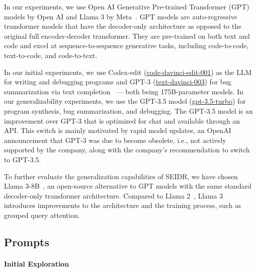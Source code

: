 In our experiments, we use Open AI Generative Pre-trained Transformer (GPT) models by Open AI and Llama 3 by Meta~\cite{roziereCodeLlamaOpen2024}. 
GPT models are auto-regressive transformer models that have the decoder-only architecture as opposed to the original full encoder-decoder transformer.
They are pre-trained on both text and code and excel at sequence-to-sequence generative tasks, including code-to-code, text-to-code, and code-to-text.

In our initial experiments, we use Codex-edit (\href{https://openai.com/index/gpt-3-edit-insert/}{code-davinci-edit-001})
as the LLM for writing and debugging programs and GPT-3 (\href{https://platform.openai.com/docs/deprecations}{text-davinci-003}) for bug summarization via text completion~\cite{brown2020:language} --- both being 175B-parameter models.
In our generalizability experiments, we use the GPT-3.5 model (\href{https://platform.openai.com/docs/models/gpt-3-5-turbo}{gpt-3.5-turbo}) for program synthesis, bug summarization, and debugging. 
The GPT-3.5 model is an improvement over GPT-3 that is optimized for chat and available through an API.
This switch is mainly motivated by rapid model updates, an OpenAI announcement that GPT-3 was due to become obsolete, i.e., not actively supported by the company, along with the company's recommendation to switch to GPT-3.5. 

To further evaluate the generalization capabilities of SEIDR, we have chosen Llama 3-8B~\cite{roziereCodeLlamaOpen2024}, an open-source alternative to GPT models with the same standard decoder-only transformer architecture. 
Compared to Llama 2~\cite{touvron2023:llama}, Llama 3 introduces improvements to the architecture and the training process, such as grouped query attention.

\newpage\subsection{Prompts}
\label{sec:seidr-prompts}

\paragraph{Initial Exploration}
\label{sec:seidr-prompt-strategies}

